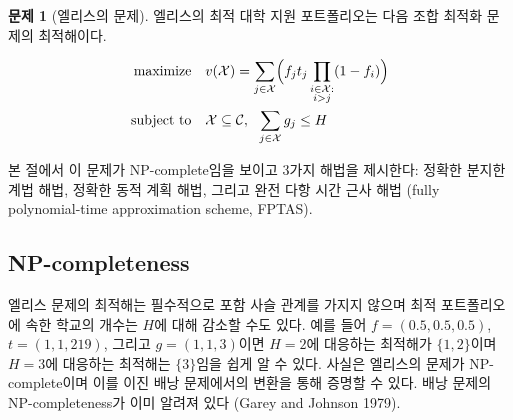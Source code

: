 \documentclass[11pt]{article} %
\newif\ifen
\theoremstyle{definition}
\newtheorem{problem}{Problem}
\theoremstyle{definition}
\newtheorem{problem}{문제}
\begin{document}
\begin{problem}[\ifen Ellis's problem\else 엘리스의 문제\fi]
\ifen
Ellis's optimal college application portfolio is given by the solution to the following combinatorial optimization problem.
\else 
엘리스의 최적 대학 지원 포트폴리오는 다음 조합 최적화 문제의 최적해이다.
\fi
\begin{align}
\begin{split}
\text{maximize}\quad &  v(\mathcal{X}) = \sum_{j\in
\mathcal{X}} \Bigl(f_j t_j \prod_{\substack{i \in \mathcal{X}: \\ i > j}} (1 - f_{i}) \Bigr)\\
\text{subject to}\quad & \mathcal{X}\subseteq\mathcal{C},~~\sum_{j \in \mathcal{X}} g_j \leq H 
\end{split}
\end{align}
\end{problem}

\ifen
In this section, we show that this problem is NP-complete, then provide three algorithmic solutions: an exact branch-and-bound routine, an exact dynamic program, and a fully polynomial-time approximation scheme (FPTAS).
\else
본 절에서 이 문제가 NP-complete임을 보이고 3가지 해법을 제시한다: 정확한 분지한계법 해법, 정확한 동적 계획 해법, 그리고 완전 다항 시간 근사 해법 (fully polynomial-time approximation scheme, FPTAS).
\fi

\ifen \subsection{NP-completeness} \else \subsection{NP-completeness}\fi
\ifen
The optima for Ellis's problem are not necessarily nested, nor is the number of schools in the optimal portfolio necessarily increasing in $H$. For example, if
$f = (0.5, 0.5, 0.5)$, $t = (1, 1, 219)$, and $g = (1, 1, 3)$,
then it is evident that the optimal portfolio for $H = 2$ is $\{1, 2\}$ while that for $H = 3$ is $\{3\}$. In fact, Ellis’s problem is NP-complete, as we will show by a transformation from the binary knapsack problem, which is known to be NP-complete (Garey and Johnson 1979).
\else
엘리스 문제의 최적해는 필수적으로 포함 사슬 관계를 가지지 않으며 최적 포트폴리오에 속한 학교의 개수는 $H$에 대해 감소할 수도 있다. 예를 들어
$f = (0.5, 0.5, 0.5)$, $t = (1, 1, 219)$, 그리고 $g = (1, 1, 3)$이면 $H = 2$에 대응하는 최적해가 $\{1, 2\}$이며 $H = 3$에 대응하는 최적해는 $\{3\}$임을 쉽게 알 수 있다. 사실은 엘리스의 문제가 NP-complete이며 이를 이진 배낭 문제에서의 변환을 통해 증명할 수 있다. 배낭 문제의 NP-completeness가 이미 알려져 있다 (Garey and Johnson 1979).
\fi
\end{document}
